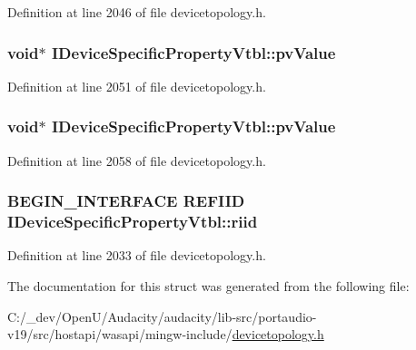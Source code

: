 Definition at line 2046 of file devicetopology.\+h.

\subsubsection[{\texorpdfstring{pv\+Value}{pvValue}}]{ {\bf void}$\ast$ I\+Device\+Specific\+Property\+Vtbl\+::pv\+Value}\hypertarget{struct_i_device_specific_property_vtbl_a9cfd189dbf31ba60b82cc9d3013bb902}{}\label{struct_i_device_specific_property_vtbl_a9cfd189dbf31ba60b82cc9d3013bb902}


Definition at line 2051 of file devicetopology.\+h.

\subsubsection[{\texorpdfstring{pv\+Value}{pvValue}}]{ {\bf void}$\ast$ I\+Device\+Specific\+Property\+Vtbl\+::pv\+Value}\hypertarget{struct_i_device_specific_property_vtbl_add16e94884aceae7e76b67030179efe0}{}\label{struct_i_device_specific_property_vtbl_add16e94884aceae7e76b67030179efe0}


Definition at line 2058 of file devicetopology.\+h.

\subsubsection[{\texorpdfstring{riid}{riid}}]{\setlength{\rightskip}{0pt plus 5cm}B\+E\+G\+I\+N\+\_\+\+I\+N\+T\+E\+R\+F\+A\+CE {\bf R\+E\+F\+I\+ID} I\+Device\+Specific\+Property\+Vtbl\+::riid}\hypertarget{struct_i_device_specific_property_vtbl_a77f8414fc5b90461ce21531b070f0298}{}\label{struct_i_device_specific_property_vtbl_a77f8414fc5b90461ce21531b070f0298}


Definition at line 2033 of file devicetopology.\+h.



The documentation for this struct was generated from the following file\+:\begin{DoxyCompactItemize}
\item 
C\+:/\+\_\+dev/\+Open\+U/\+Audacity/audacity/lib-\/src/portaudio-\/v19/src/hostapi/wasapi/mingw-\/include/\hyperlink{devicetopology_8h}{devicetopology.\+h}\end{DoxyCompactItemize}
